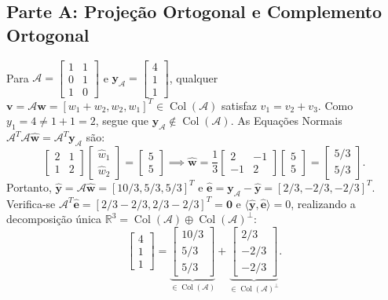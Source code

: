 \documentclass[11pt,a4paper]{article}
\begin{document}
\subsection{Parte A: Projeção Ortogonal e Complemento Ortogonal}
Para $\mathcal{A} = \begin{bmatrix} 1 & 1 \\ 0 & 1 \\ 1 & 0 \end{bmatrix}$ e $\mathbf{y}_{\mathcal{A}} = \begin{bmatrix} 4 \\ 1 \\ 1 \end{bmatrix}$, qualquer $\mathbf{v} = \mathcal{A}\mathbf{w} = [w_1+w_2, w_2, w_1]^T \in \operatorname{Col}(\mathcal{A})$ satisfaz $v_1 = v_2 + v_3$. Como $y_1 = 4 \ne 1 + 1 = 2$, segue que $\mathbf{y}_{\mathcal{A}} \notin \operatorname{Col}(\mathcal{A})$.
As Equações Normais $\mathcal{A}^T\mathcal{A}\hat{\mathbf{w}} = \mathcal{A}^T\mathbf{y}_{\mathcal{A}}$ são:
\[
\begin{bmatrix} 2 & 1 \\ 1 & 2 \end{bmatrix} \begin{bmatrix} \hat{w}_1 \\ \hat{w}_2 \end{bmatrix} = \begin{bmatrix} 5 \\ 5 \end{bmatrix}
\implies \hat{\mathbf{w}} = \frac{1}{3}\begin{bmatrix} 2 & -1 \\ -1 & 2 \end{bmatrix}\begin{bmatrix} 5 \\ 5 \end{bmatrix} = \begin{bmatrix} 5/3 \\ 5/3 \end{bmatrix}.
\]
Portanto, $\hat{\mathbf{y}} = \mathcal{A}\hat{\mathbf{w}} = [10/3, 5/3, 5/3]^T$ e $\hat{\mathbf{e}} = \mathbf{y}_{\mathcal{A}} - \hat{\mathbf{y}} = [2/3, -2/3, -2/3]^T$. Verifica-se $\mathcal{A}^T\hat{\mathbf{e}} = [2/3-2/3, 2/3-2/3]^T = \mathbf{0}$ e $\langle \hat{\mathbf{y}}, \hat{\mathbf{e}} \rangle = 0$, realizando a decomposição única $\mathbb{R}^3 = \operatorname{Col}(\mathcal{A}) \oplus \operatorname{Col}(\mathcal{A})^\perp$:
\[
\begin{bmatrix} 4 \\ 1 \\ 1 \end{bmatrix} = \underbrace{\begin{bmatrix} 10/3 \\ 5/3 \\ 5/3 \end{bmatrix}}_{\in \operatorname{Col}(\mathcal{A})} + \underbrace{\begin{bmatrix} 2/3 \\ -2/3 \\ -2/3 \end{bmatrix}}_{\in \operatorname{Col}(\mathcal{A})^\perp}.
\]
\end{document}
